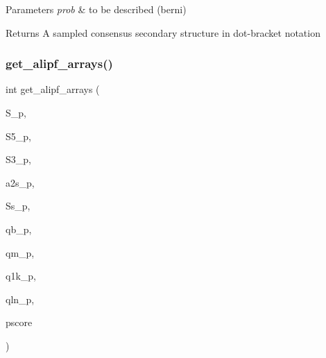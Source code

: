 \begin{DoxyParams}{Parameters}
{\em prob} & to be described (berni) \\
\hline
\end{DoxyParams}
\begin{DoxyReturn}{Returns}
A sampled consensus secondary structure in dot-\/bracket notation 
\end{DoxyReturn}
\mbox{\label{group__part__func__global__deprecated_ga5349960075b1847720a2e9df021e2675}} 
\subsubsection{\texorpdfstring{get\_alipf\_arrays()}{get\_alipf\_arrays()}}
{\footnotesize\ttfamily int get\+\_\+alipf\+\_\+arrays (\begin{DoxyParamCaption}\item[{short $\ast$$\ast$$\ast$}]{S\+\_\+p,  }\item[{short $\ast$$\ast$$\ast$}]{S5\+\_\+p,  }\item[{short $\ast$$\ast$$\ast$}]{S3\+\_\+p,  }\item[{unsigned short $\ast$$\ast$$\ast$}]{a2s\+\_\+p,  }\item[{char $\ast$$\ast$$\ast$}]{Ss\+\_\+p,  }\item[{\mbox{\hyperlink{group__data__structures_ga31125aeace516926bf7f251f759b6126}{F\+L\+T\+\_\+\+O\+R\+\_\+\+D\+BL}} $\ast$$\ast$}]{qb\+\_\+p,  }\item[{\mbox{\hyperlink{group__data__structures_ga31125aeace516926bf7f251f759b6126}{F\+L\+T\+\_\+\+O\+R\+\_\+\+D\+BL}} $\ast$$\ast$}]{qm\+\_\+p,  }\item[{\mbox{\hyperlink{group__data__structures_ga31125aeace516926bf7f251f759b6126}{F\+L\+T\+\_\+\+O\+R\+\_\+\+D\+BL}} $\ast$$\ast$}]{q1k\+\_\+p,  }\item[{\mbox{\hyperlink{group__data__structures_ga31125aeace516926bf7f251f759b6126}{F\+L\+T\+\_\+\+O\+R\+\_\+\+D\+BL}} $\ast$$\ast$}]{qln\+\_\+p,  }\item[{short $\ast$$\ast$}]{pscore }\end{DoxyParamCaption})}



